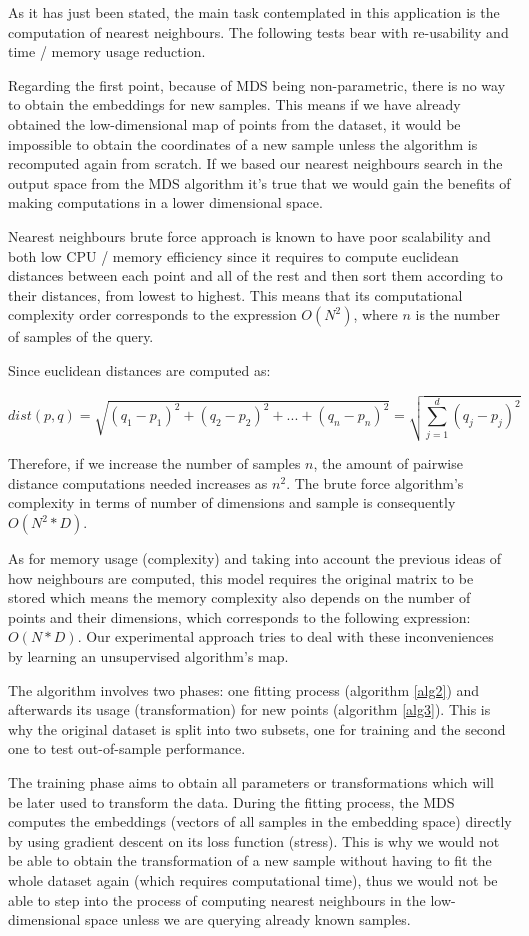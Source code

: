 \documentclass[a4paper,11pt,spanish]{report}
\begin{document}
As it has just been stated, the main task contemplated in this application is the computation of nearest neighbours. The following tests bear with re-usability and time / memory usage reduction.

Regarding the first point, because of MDS being non-parametric, there is no way to obtain the embeddings for new samples. This means if we have already obtained the low-dimensional map of points from the dataset, it would be impossible to obtain the coordinates of a new sample unless the algorithm is recomputed again from scratch. If we based our nearest neighbours search in the output space from the MDS algorithm it's true that we would gain the benefits of making computations in a lower dimensional space.

Nearest neighbours brute force approach \citep{brute} is known to have poor scalability and both low CPU / memory efficiency since it requires to compute euclidean distances between each point and all of the rest and then sort them according to their distances, from lowest to highest. This means that its computational complexity order corresponds to the expression $O(N^{2})$, where $n$ is the number of samples of the query.

Since euclidean distances are computed as:

$$ dist(p,q) = \sqrt{(q_{1}-p_{1})^{2}+(q_{2}-p_{2})^{2}+ ... + (q_{n}-p_{n})^{2}} = \sqrt{\sum_{j=1}^{d} (q_{j}-p_{j})^{2}}$$

Therefore, if we increase the number of samples $n$, the amount of pairwise distance computations needed increases as $n^{2}$. The brute force algorithm's complexity in terms of number of dimensions and sample is consequently $O(N^{2}*D)$.

As for memory usage (complexity) and taking into account the previous ideas of how neighbours are computed, this model requires the original matrix to be stored which means the memory complexity also depends on the number of points and their dimensions, which corresponds to the following expression: $O(N*D)$. Our experimental approach tries to deal with these inconveniences by learning an unsupervised algorithm's map.

The algorithm involves two phases: one fitting process (algorithm \ref{alg2}) and afterwards its usage (transformation) for new points (algorithm \ref{alg3}). This is why the original dataset is split into two subsets, one for training and the second one to test out-of-sample performance.

The training phase aims to obtain all parameters or transformations which will be later used to transform the data. During the fitting process, the MDS computes the embeddings (vectors of all samples in the embedding space) directly by using gradient descent on its loss function (stress). This is why we would not be able to obtain the transformation of a new sample without having to fit the whole dataset again (which requires computational time), thus we would not be able to step into the process of computing nearest neighbours in the low-dimensional space unless we are querying already known samples.
\end{document}
